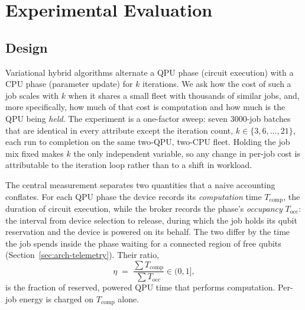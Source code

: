 %
%
%

\section{Experimental Evaluation}
\label{sec:eval}

\subsection{Design}
\label{sec:eval-design}

Variational hybrid algorithms alternate a QPU phase (circuit execution) with
a CPU phase (parameter update) for $k$ iterations. We ask how the cost of
such a job scales with $k$ when it shares a small fleet with thousands of
similar jobs, and, more specifically, how much of that cost is computation
and how much is the QPU being \emph{held}. The experiment is a one-factor
sweep: seven 3000-job batches that are identical in every attribute except
the iteration count, $k \in \{3, 6, \dots, 21\}$, each run to completion on
the same two-QPU, two-CPU fleet. Holding the job mix fixed makes $k$ the only
independent variable, so any change in per-job cost is attributable to the
iteration loop rather than to a shift in workload.

The central measurement separates two quantities that a naive accounting
conflates. For each QPU phase the device records its \emph{computation} time
$T_{\mathrm{comp}}$, the duration of circuit execution, while the broker
records the phase's \emph{occupancy} $T_{\mathrm{occ}}$: the interval from
device selection to release, during which the job holds its qubit
reservation and the device is powered on its behalf. The two differ by the
time the job spends inside the phase waiting for a connected region of free
qubits (Section~\ref{sec:arch-telemetry}). Their ratio,
\begin{equation}
\eta \;=\; \frac{\sum T_{\mathrm{comp}}}{\sum T_{\mathrm{occ}}} \in (0, 1],
\label{eq:eta}
\end{equation}
is the fraction of reserved, powered QPU time that performs computation.
Per-job energy is charged on $T_{\mathrm{comp}}$ alone.

